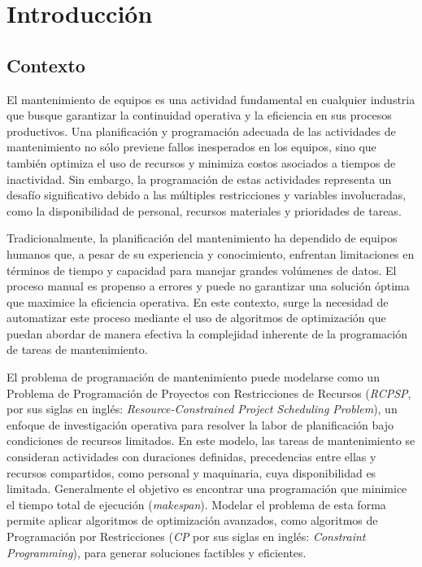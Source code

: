 \documentclass{article}
\begin{document}
\tableofcontents
\newpage

\section{Introducción}

\subsection{Contexto}
El mantenimiento de equipos es una actividad fundamental en cualquier industria que busque garantizar la continuidad operativa y la eficiencia en sus procesos productivos. Una planificación y programación adecuada de las actividades de mantenimiento no sólo previene fallos inesperados en los equipos, sino que también optimiza el uso de recursos y minimiza costos asociados a tiempos de inactividad. Sin embargo, la programación de estas actividades representa un desafío significativo debido a las múltiples restricciones y variables involucradas, como la disponibilidad de personal, recursos materiales y prioridades de tareas.

Tradicionalmente, la planificación del mantenimiento ha dependido de equipos humanos que, a pesar de su experiencia y conocimiento, enfrentan limitaciones en términos de tiempo y capacidad para manejar grandes volúmenes de datos. El proceso manual es propenso a errores y puede no garantizar una solución óptima que maximice la eficiencia operativa. En este contexto, surge la necesidad de automatizar este proceso mediante el uso de algoritmos de optimización que puedan abordar de manera efectiva la complejidad inherente de la programación de tareas de mantenimiento.

El problema de programación de mantenimiento puede modelarse como un Problema de Programación de Proyectos con Restricciones de Recursos (\textit{RCPSP}, por sus siglas en inglés: \textit{Resource-Constrained Project Scheduling Problem}), un enfoque de investigación operativa para resolver la labor de planificación bajo condiciones de recursos limitados. En este modelo, las tareas de mantenimiento se consideran actividades con duraciones definidas, precedencias entre ellas y recursos compartidos, como personal y maquinaria, cuya disponibilidad es limitada. Generalmente el objetivo es encontrar una programación que minimice el tiempo total de ejecución (\textit{makespan}). Modelar el problema de esta forma permite aplicar algoritmos de optimización avanzados, como algoritmos de Programación por Restricciones (\textit{CP} por sus siglas en inglés: \textit{Constraint Programming}), para generar soluciones factibles y eficientes.
\end{document}

